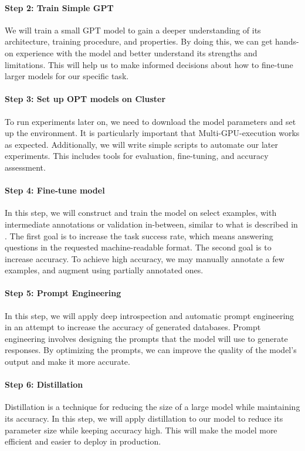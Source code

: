 \documentclass[a4paper,11pt]{article}
\begin{document}
\paragraph{Step 2: Train Simple GPT}
We will train a small GPT model to gain a deeper understanding of its
architecture, training procedure, and properties. By doing this, we can get
hands-on experience with the model and better understand its strengths and
limitations. This will help us to make informed decisions about how to
fine-tune larger models for our specific task.


\paragraph{Step 3: Set up OPT models on Cluster}
To run experiments later on, we need to download the model parameters and set
up the environment. It is particularly important that Multi-GPU-execution works
as expected. Additionally, we will write simple scripts to automate our later
experiments. This includes tools for evaluation, fine-tuning, and accuracy
assessment.


\paragraph{Step 4: Fine-tune model}
In this step, we will construct and train the model on select examples, with
intermediate annotations or validation in-between, similar to what is described
in \cite{dunn_structured_2022}. The first goal is to increase the task success
rate, which means answering questions in the requested machine-readable format.
The second goal is to increase accuracy. To achieve high accuracy, we may
manually annotate a few examples, and augment using partially annotated ones.


\paragraph{Step 5: Prompt Engineering}
In this step, we will apply deep introspection and automatic prompt engineering
\cite{zhou_large_2022} in an attempt to increase the accuracy of generated
databases. Prompt engineering involves designing the prompts that the model
will use to generate responses. By optimizing the prompts, we can improve the
quality of the model's output and make it more accurate.


\paragraph{Step 6: Distillation}
Distillation is a technique for reducing the size of a large model while
maintaining its accuracy. In this step, we will apply distillation
\cite{sun_patient_2019} to our model to reduce its parameter size while keeping
accuracy high. This will make the model more efficient and easier to deploy in
production.
\end{document}
